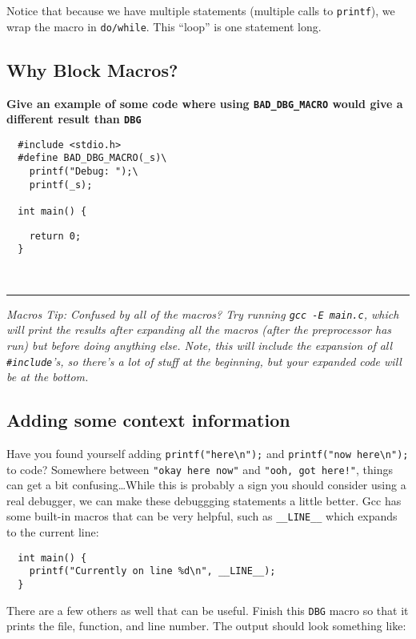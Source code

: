 \documentclass{article}
\begin{document}
Notice that because we have multiple statements (multiple calls to
\texttt{printf}), we wrap the macro in \texttt{do/while}. This ``loop'' is
one statement long.

\subsection{Why Block Macros?}
\textbf{Give an example of some code where using \texttt{BAD\_DBG\_MACRO}
  would give a different result than \texttt{DBG}}
\begin{lstlisting}
  #include <stdio.h>
  #define BAD_DBG_MACRO(_s)\
    printf("Debug: ");\
    printf(_s);

  int main() {
\end{lstlisting}

\vfill
\texttt{~~~~return 0;\\~~\}}

~

\hrule
\emph{\footnotesize Macros Tip: Confused by all of the macros? Try running
  \texttt{gcc~-E~main.c}, which will print the results after expanding all the
  macros (after the preprocessor has run) but before doing anything else.
  Note, this will include the expansion of all \texttt{\#include}'s, so
  there's a lot of stuff at the beginning, but your expanded code will be at
  the bottom.}

\subsection{Adding some context information}

Have you found yourself adding \texttt{printf("here\textbackslash{n}");} and
\texttt{printf("now~here\textbackslash{n}");} to code? Somewhere between
\texttt{"okay~here~now"} and \texttt{"ooh, got here!"}, things can get a bit
confusing\dots While this is probably a sign you should consider using a real
debugger, we can make these debuggging statements a little better. Gcc has
some built-in macros that can be very helpful, such as \texttt{\_\_LINE\_\_}
which expands to the current line:
\begin{lstlisting}
  int main() {
    printf("Currently on line %d\n", __LINE__);
  }
\end{lstlisting}

There are a few others as well that can be useful. Finish this \texttt{DBG}
macro so that it prints the file, function, and line number. The output should
look something like:
\end{document}
